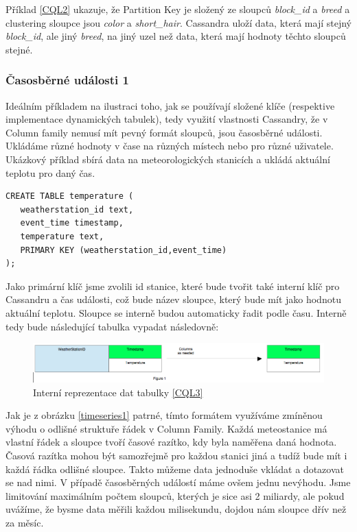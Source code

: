 Příklad \ref{CQL2} ukazuje, že Partition Key je složený ze sloupců \emph{block\_id} a  \emph{breed} a clustering sloupce jsou \emph{color} a \emph{short\_hair}. Cassandra uloží data, která mají stejný \emph{block\_id}, ale jiný \emph{breed}, na jiný uzel než data, která mají hodnoty těchto sloupců stejné.  


\subsubsection*{Časosběrné události 1}
Ideálním příkladem na ilustraci toho, jak se používají složené klíče (respektive implementace dynamických tabulek), tedy využití vlastnosti Cassandry, že v Column family nemusí mít pevný formát sloupců, jsou časosběrné události. Ukládáme různé hodnoty v čase na různých místech nebo pro různé uživatele. Ukázkový příklad sbírá data na meteorologických stanicích a ukládá aktuální teplotu pro daný čas.

\begin{lstlisting}[caption={Dynamická tabulka 1},label=CQL3]
CREATE TABLE temperature (
   weatherstation_id text,
   event_time timestamp,
   temperature text,
   PRIMARY KEY (weatherstation_id,event_time)
);
\end{lstlisting}

Jako primární klíč jsme zvolili id stanice, které bude tvořit také interní klíč pro Cassandru a čas události, což bude název sloupce, který bude mít jako hodnotu aktuální teplotu. Sloupce se interně budou automaticky řadit podle času. Interně tedy bude následující tabulka vypadat následovně: 

\begin{figure}[h]
\centering
\includegraphics[scale=0.4]{images/timeseries1}
\caption{Interní reprezentace dat tabulky \ref{CQL3}}
\label{fig:timeseries1}
\end{figure}

Jak je z obrázku \ref{timeseries1} patrné, tímto formátem využíváme zmíněnou výhodu o odlišné struktuře řádek v Column Family. Každá meteostanice má vlastní řádek a sloupce tvoří časové razítko, kdy byla naměřena daná hodnota. Časová razítka mohou být samozřejmě pro každou stanici jiná a tudíž bude mít i každá řádka odlišné sloupce. Takto můžeme data jednoduše vkládat a dotazovat se nad nimi. V případě časosběrných událostí máme ovšem jednu nevýhodu. Jsme limitování maximálním počtem sloupců, kterých je sice asi 2 miliardy, ale pokud uvážíme, že bysme data měřili každou milisekundu, dojdou nám sloupce dřív než za měsíc.  


